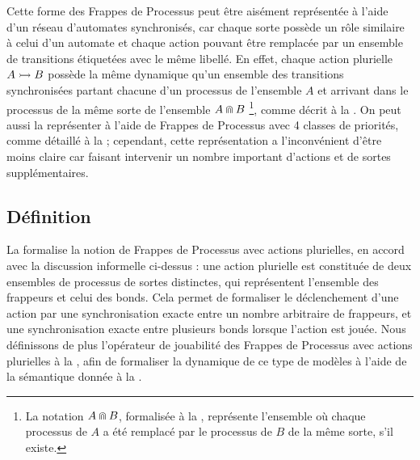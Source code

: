 Cette forme des Frappes de Processus peut être aisément représentée à l'aide d'un réseau
d'automates synchronisés, car chaque sorte possède un rôle similaire à celui d'un automate
et chaque action pouvant être remplacée par un ensemble de transitions étiquetées
avec le même libellé.
En effet, chaque action plurielle $\mbox{$A \rightarrowtail B$}$
possède la même dynamique qu'un ensemble des transitions synchronisées
partant chacune d'un processus de l'ensemble $A$ et
arrivant dans le processus de la même sorte de l'ensemble $A \Cap B$%
\footnote{La notation $A \Cap B$, formalisée à la , représente
l'ensemble où chaque processus de $A$ a été remplacé par
le processus de $B$ de la même sorte, s'il existe.},
comme décrit à la .
On peut aussi la représenter à l'aide de Frappes de Processus avec 4 classes de priorités,
comme détaillé à la  ;
cependant, cette représentation a l'inconvénient d'être moins claire car faisant intervenir
un nombre important d'actions et de sortes supplémentaires.



\subsection{Définition}

La  formalise la notion de Frappes de Processus avec actions plurielles,
en accord avec la discussion informelle ci-dessus :
une action plurielle est constituée de deux ensembles de processus de sortes distinctes,
qui représentent l'ensemble des frappeurs et celui des bonds.
Cela permet de formaliser le déclenchement d'une action par une synchronisation exacte
entre un nombre arbitraire de frappeurs,
et une synchronisation exacte entre plusieurs bonds lorsque l'action est jouée.
Nous définissons de plus l'opérateur de jouabilité
des Frappes de Processus avec actions plurielles
à la ,
afin de formaliser la dynamique de ce type de modèles
à l'aide de la sémantique donnée à la .

